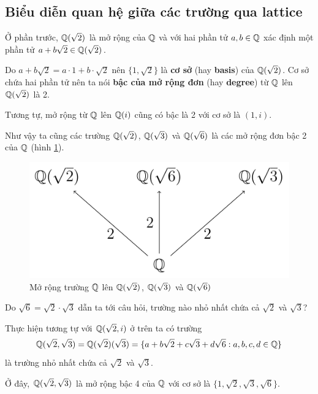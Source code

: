 \subsection*{Biểu diễn quan hệ giữa các trường qua lattice}

Ở phần trước, $\mathbb{Q}(\sqrt{2})$ là mở rộng của $\mathbb{Q}$ và với hai phần tử $a, b \in \mathbb{Q}$ xác định một phần tử $a + b \sqrt{2} \in \mathbb{Q}(\sqrt{2})$.

Do $a + b \sqrt{2} = a \cdot 1 + b \cdot \sqrt{2}$ nên $\{ 1, \sqrt{2} \}$ là \textbf{cơ sở} (hay \textbf{basis}) của $\mathbb{Q}(\sqrt{2})$. Cơ sở chứa hai phần tử nên ta nói \textbf{bậc của mở rộng đơn} (hay \textbf{degree}) từ $\mathbb{Q}$ lên $\mathbb{Q}(\sqrt{2})$ là 2.

Tương tự, mở rộng từ $\mathbb{Q}$ lên $\mathbb{Q}(i)$ cũng có bậc là 2 với cơ sở là $(1, i)$.

Như vậy ta cũng các trường $\mathbb{Q}(\sqrt{2})$, $\mathbb{Q}(\sqrt{3})$ và $\mathbb{Q}(\sqrt{6})$ là các mở rộng đơn bậc 2 của $\mathbb{Q}$ (hình \ref{extension_field:1}).

\begin{figure}[htb]
    \centering
    \includegraphics[page=1]{figures/extension_field.pdf}
    \caption{Mở rộng trường $\mathbb{Q}$ lên $\mathbb{Q}(\sqrt{2})$, $\mathbb{Q}(\sqrt{3})$ và $\mathbb{Q}(\sqrt{6})$}
    \label{extension_field:1}
\end{figure}

Do $\sqrt{6} = \sqrt{2} \cdot \sqrt{3}$ dẫn ta tới câu hỏi, trường nào nhỏ nhất chứa cả $\sqrt{2}$ và $\sqrt{3}$?

Thực hiện tương tự với $\mathbb{Q}(\sqrt{2}, i)$ ở trên ta có trường
\begin{equation*}
    \mathbb{Q}(\sqrt{2}, \sqrt{3}) = \mathbb{Q}(\sqrt{2})(\sqrt{3}) = \{ a + b \sqrt{2} + c \sqrt{3} + d \sqrt{6} : a, b, c, d \in \mathbb{Q} \}
\end{equation*}
là trường nhỏ nhất chứa cả $\sqrt{2}$ và $\sqrt{3}$.

Ở đây, $\mathbb{Q}(\sqrt{2}, \sqrt{3})$ là mở rộng bậc 4 của $\mathbb{Q}$ với cơ sở là $\{ 1, \sqrt{2}, \sqrt{3}, \sqrt{6} \}$.

